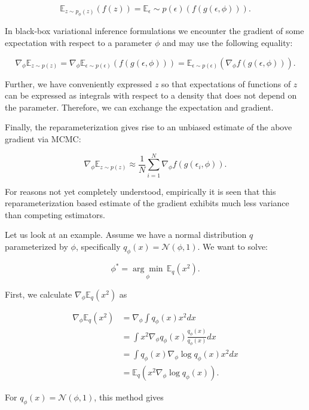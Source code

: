 \documentclass[11pt]{article}
\def\N{\mathcal{N}}
\def\E{\mathbb{E}}
\def\eps{\epsilon}
\begin{document}
\begin{equation}
\E_{z\sim p_\phi (z)}(f(z)) = \E_\eps\sim p(\eps)(f(g(\eps,\phi))).
\end{equation}

In black-box variational inference formulations we encounter the gradient of some expectation with respect to a parameter $\phi$ and may use the following equality:

\begin{equation}
\nabla_\phi\E_{z\sim p(z)} = \nabla_\phi\E_{\eps\sim p(\eps)}(f(g(\eps,\phi))) = \E_{\eps\sim p(\eps)}(\nabla_\phi f(g(\eps,\phi))).
\end{equation}

Further, we have conveniently expressed $z$ so that expectations of functions of $z$ can be expressed as integrals with respect to a density that does not depend on the parameter. Therefore, we can exchange the expectation and gradient.

Finally, the reparameterization gives rise to an unbiased estimate of the above gradient via MCMC:

\begin{equation}
\nabla_\phi\E_{z\sim p(z)} \approx \frac{1}{N} \sum_{i=1}^N \nabla_\phi f(g(\eps_i, \phi)).
\end{equation}

For reasons not yet completely understood, empirically it is seen that this reparameterization based estimate of the gradient exhibits much less variance than competing estimators.

Let us look at an example. Assume we have a normal distribution $q$ parameterized by $\phi$, specifically $q_\phi(x) = \N(\phi,1)$. We want to solve:

\begin{equation}
\phi^* = \underset{\phi}{\arg\min} \, \E_q(x^2).
\end{equation}

First, we calculate $\nabla_\phi\E_q(x^2)$ as

\begin{align}
\nabla_\phi\E_q(x^2)
&= \nabla_\phi \int q_\phi(x)x^2dx\\
&= \int x^2 \nabla_\phi q_\phi(x)\frac{q_\phi(x)}{q_\phi(x)}dx\\
&= \int q_\phi(x)\nabla_\phi\log q_\phi(x)x^2dx\\
&= \E_q(x^2 \nabla_\phi \log q_\phi(x)).
\end{align}

For $q_\phi(x) = \N(\phi,1)$, this method gives
\end{document}
